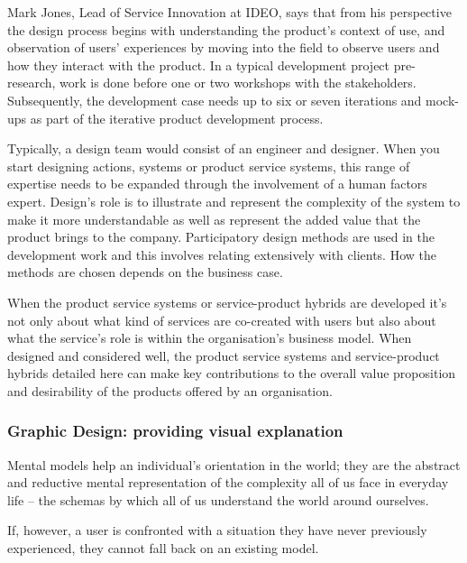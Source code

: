 Mark Jones, Lead of Service Innovation at IDEO, says that from his perspective the design process begins with understanding the product’s context of use, and observation of users’ experiences by moving into the field to observe users and how they interact with the product. In a typical development project pre-research, work is done before one or two workshops with the stakeholders. Subsequently, the development case needs up to six or seven iterations and mock-ups as part of the iterative product development process.

Typically, a design team would consist of an engineer and designer. When you start designing actions, systems or product service systems, this range of expertise needs to be expanded through the involvement of a human factors expert. Design’s role is to illustrate and represent the complexity of the system to make it more understandable as well as represent the added value that the product brings to the company. Participatory design methods are used in the development work and this involves relating extensively with clients. How the methods are chosen depends on the business case.

When the product service systems or service-product hybrids are developed it’s not only about what kind of services are co-created with users but also about what the service’s role is within the organisation’s business model. When designed and considered well, the product service systems and service-product hybrids detailed here can make key contributions to the overall value proposition and desirability of the products offered by an organisation.

\subsubsection{Graphic Design: providing visual explanation}

Mental models help an individual’s orientation in the world; they are the abstract and reductive mental representation of the complexity all of us face in everyday life – the schemas by which all of us understand the world around ourselves.

If, however, a user is confronted with a situation they have never previously experienced, they cannot fall back on an existing model.

